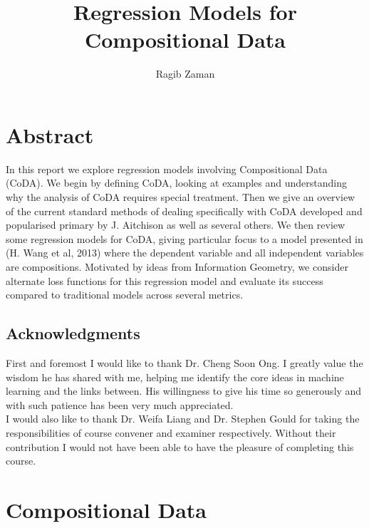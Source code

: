 \documentclass[BSc]{usydthesis}
\author{Ragib Zaman}
\title{Regression Models for Compositional Data}
\numberwithin{equation}{chapter}
\theoremstyle{remark}
\begin{document}
  


\maketitle          %
\chapter*{Abstract}
In this report we explore regression models involving Compositional Data (CoDA). We begin by defining CoDA, looking at examples and understanding why the analysis of CoDA requires special treatment. Then we give an overview of the current standard methods of dealing specifically with CoDA developed and popularised primary by J. Aitchison as well as several others. We then review some regression models for CoDA, giving particular focus to a model presented in (H. Wang et al, 2013) where the dependent variable and all independent variables are compositions. Motivated by ideas from Information Geometry, we consider alternate loss functions for this regression model and evaluate its success compared to traditional models across several metrics.\\ 
\section*{Acknowledgments}
First and foremost I would like to thank Dr. Cheng Soon Ong. I greatly value the wisdom he has shared with me, helping me identify the core ideas in machine learning and the links between. His willingness to give his time so generously and with such patience has been very much appreciated.\\

I would also like to thank Dr. Weifa Liang and Dr. Stephen Gould for taking the responsibilities of course convener and examiner respectively. Without their contribution I would not have been able to have the pleasure of completing this course. 
\tableofcontents    %

\newpage\setcounter{page}{1}

\chapter{Compositional Data}
\end{document}
